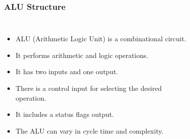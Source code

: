 \begin{frame}
    \frametitle{ALU Structure}
    \begin{columns}
        \begin{itemize}
            \item ALU (Arithmetic Logic Unit) is a combinational circuit.
            \item It performs arithmetic and logic operations.
            \item It has two inputs and one output.
            \item There is a control input for selecting the desired operation.
            \item It includes a status flags output.
            \item The ALU can vary in cycle time and complexity.
        \end{itemize}

            \newsavebox{\asciialu}
            \begin{lrbox}{\asciialu}
                \begin{varwidth}{\maxdimen}
                \end{varwidth}
            \end{lrbox}%

            \begin{figure}[h]
                \centering
                \scalebox{0.7}{\usebox{\asciialu}}
            \end{figure}
    \end{columns}
    \note{
    }
\end{frame}
